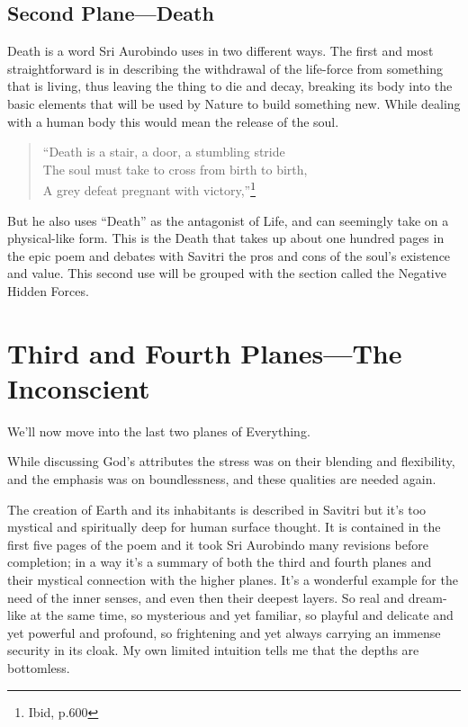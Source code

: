 \documentclass[12pt,a4paper]{book}
\begin{document}
\newpage
\begin{center}\section*{Second Plane---Death}\end{center}

Death is a word Sri Aurobindo uses in two different ways. The first
and most straightforward is in describing the withdrawal of the
life-force from something that is living, thus leaving the thing to
die and decay, breaking its body into the basic elements that will be
used by Nature to build something new. While dealing with a human body
this would mean the release of the soul.

\begin{verse}
``Death is a stair, a door, a stumbling stride\\
The soul must take to cross from birth to birth,\\
A grey defeat pregnant with victory,''\footnote{Ibid, p.600}
\end{verse}

But he also uses ``Death'' as the antagonist of Life, and can
seemingly take on a physical-like form. This is the Death that takes
up about one hundred pages in the epic poem and debates with Savitri
the pros and cons of the soul's existence and value. This second use
will be grouped with the section called the Negative Hidden Forces.


\newpage
\section*{Third and Fourth Planes---The Inconscient}

We'll now move into the last two planes of Everything.

While discussing God's attributes the stress was on their blending and
flexibility, and the emphasis was on boundlessness, and these
qualities are needed again.

The creation of Earth and its inhabitants is described in Savitri but
it's too mystical and spiritually deep for human surface thought. It
is contained in the first five pages of the poem and it took Sri
Aurobindo many revisions before completion; in a way it's a summary of
both the third and fourth planes and their mystical connection with
the higher planes. It's a wonderful example for the need of the inner
senses, and even then their deepest layers. So real and dream-like at
the same time, so mysterious and yet familiar, so playful and delicate
and yet powerful and profound, so frightening and yet always carrying
an immense security in its cloak. My own limited intuition tells me
that the depths are bottomless.
\end{document}
